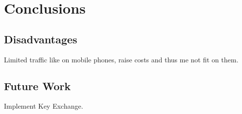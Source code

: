 \section{Conclusions}
\subsection{Disadvantages}
Limited traffic like on mobile phones, raise costs and thus me not
fit on them.
\subsection{Future Work}
Implement Key Exchange.
